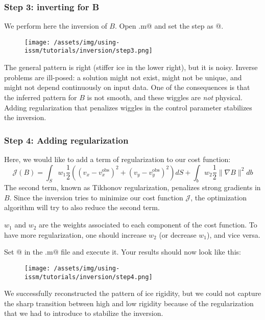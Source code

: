 \subsubsection{Step 3: inverting for B}
We perform here the inversion of $B$. Open \verb@runme.m@ and set the step as @.
\begin{figure}[H]
	\begin{center}
		\texttt{[image: /assets/img/using-issm/tutorials/inversion/step3.png]}
	\end{center}
\end{figure}
The general pattern is right (stiffer ice in the lower right), but it is noisy. Inverse problems are
ill-posed: a solution might not exist, might not be unique, and might not depend continuously on
input data. One of the consequences is that the inferred pattern for $B$ is not smooth, and these
wiggles are \emph{not} physical. Adding regularization that penalizes wiggles in the control parameter stabilizes the inversion.

\subsubsection{Step 4: Adding regularization}
Here, we would like to add a term of regularization to our cost function:
\begin{equation}
	{\mathcal J\left(B\right)}
	=
	\int_{S} w_1 \dfrac{1}{2}\left(
	\left(v_x-v_x^{\text{obs}}\right)^{2}
	+\left(v_y-v_y^{\text{obs}}\right)^{2}
	\right) dS
	+
	\int_{b} w_2 \dfrac{1}{2}
	\|\nabla B \|^{2}
	db
\end{equation}
The second term, known as Tikhonov regularization, penalizes strong gradients in $B$. Since the inversion tries to minimize our cost function $\mathcal J$, the optimization algorithm will try to also reduce the second term.

$w_1$ and $w_2$ are the weights associated to each component of the cost function. To have more regularization, one should increase $w_2$ (or decrease $w_1$), and vice versa.

Set @ in the \verb@runme.m@ file and execute it. Your results should now look like this:
\begin{figure}[H]
	\begin{center}
		\texttt{[image: /assets/img/using-issm/tutorials/inversion/step4.png]}
	\end{center}
\end{figure}
We successfully reconstructed the pattern of ice rigidity, but we could not capture the sharp transition between high and low rigidity because of the regularization that we had to introduce to stabilize the inversion.
